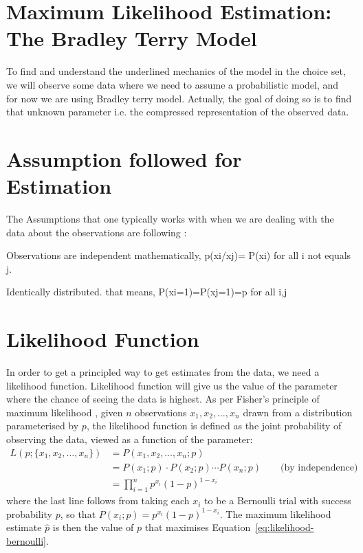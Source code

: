 \documentclass{article}
\begin{document}
\section*{Maximum Likelihood Estimation: The Bradley Terry Model}

To find and understand the underlined mechanics of the model in the choice set, we will observe some data where we need to  assume a probabilistic model, and for now we are using Bradley terry model.
Actually, the goal of doing so is to find that unknown parameter i.e. the compressed representation of the observed data.
\section{Assumption followed for Estimation}
The Assumptions that one typically works with when we are dealing with the data about the observations are following :
\item Observations are independent 
mathematically, 
p(xi/xj)= P(xi) for all i not equals j.
\item Identically distributed.
that means, 
P(xi=1)=P(xj=1)=p for all i,j
\section{Likelihood Function}
In order to get a principled way to get estimates from the data, we need a likelihood function.
Likelihood function will give us the value of the parameter where the chance of seeing the data is highest.
As per Fisher's principle of maximum likelihood \citep{fisher1922mathematical}, given $n$
observations $x_1, x_2, \dots, x_n$ drawn from a distribution parameterised by $p$, the
likelihood function is defined as the joint probability of observing the data, viewed as a
function of the parameter:
\begin{align}
    L(p ; \{x_1, x_2, \dots, x_n\}) &= P(x_1, x_2, \dots, x_n ; p) \label{eq:likelihood-def} \\
    &= P(x_1 ; p) \cdot P(x_2 ; p) \cdots P(x_n ; p) \qquad \text{(by independence)} \label{eq:likelihood-product} \\
    &= \prod_{i=1}^{n} p^{x_i} (1-p)^{1-x_i} \label{eq:likelihood-bernoulli}
\end{align}
where the last line follows from taking each $x_i$ to be a Bernoulli trial with success
probability $p$, so that $P(x_i ; p) = p^{x_i}(1-p)^{1-x_i}$. The maximum likelihood estimate
$\hat{p}$ is then the value of $p$ that maximises Equation~\eqref{eq:likelihood-bernoulli}.
\end{document}
